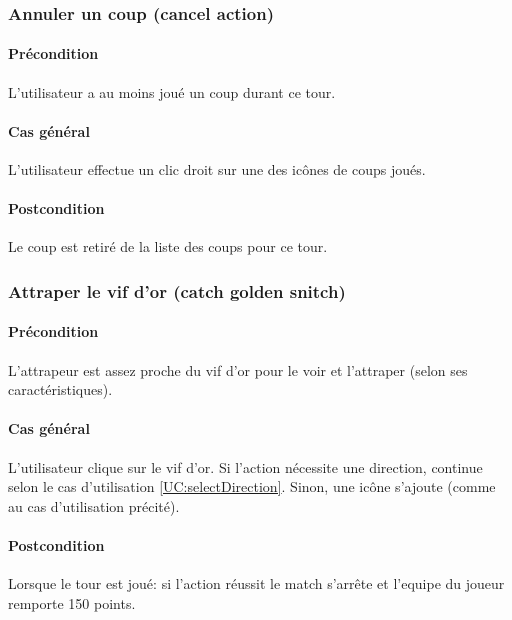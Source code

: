 \subsubsection{Annuler un coup (cancel action)}
    \paragraph{Précondition} L'utilisateur a au moins joué un coup durant ce \gls{tour}.
    \paragraph{Cas général} L'utilisateur effectue un clic droit sur une des icônes de coups joués.
    \paragraph{Postcondition} Le coup est retiré de la liste des coups pour ce tour.

\subsubsection{Attraper le vif d'or (catch golden snitch)}
    \paragraph{Précondition} L'attrapeur est assez proche du vif d'or pour le voir et l'attraper (selon ses caractéristiques).
    \paragraph{Cas général} L'utilisateur clique sur le vif d'or. Si l'action nécessite une direction, continue selon le cas d'utilisation \ref{UC:selectDirection}. Sinon, une icône s'ajoute (comme au cas d'utilisation précité).
    \paragraph{Postcondition} Lorsque le tour est joué: si l'action réussit le match s'arrête et l'\gls{equipe} du joueur remporte 150 points.


